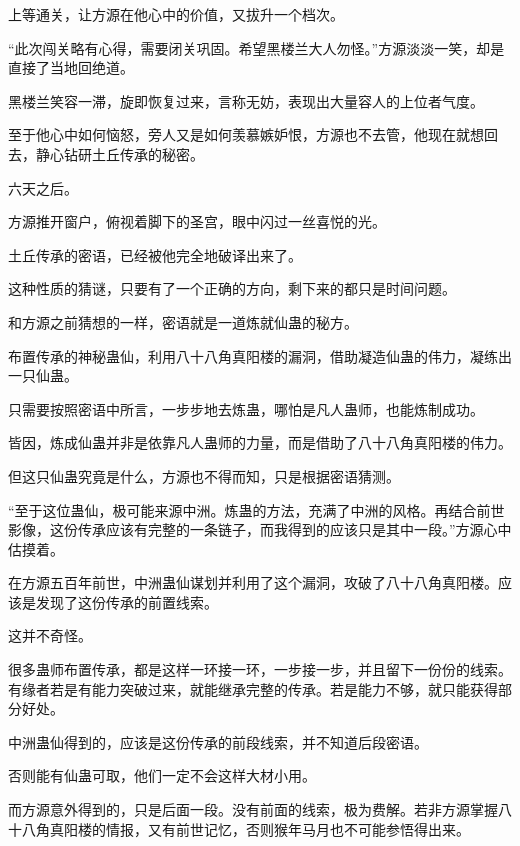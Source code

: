 \begin{this_body}
上等通关，让方源在他心中的价值，又拔升一个档次。

“此次闯关略有心得，需要闭关巩固。希望黑楼兰大人勿怪。”方源淡淡一笑，却是直接了当地回绝道。

黑楼兰笑容一滞，旋即恢复过来，言称无妨，表现出大量容人的上位者气度。

至于他心中如何恼怒，旁人又是如何羡慕嫉妒恨，方源也不去管，他现在就想回去，静心钻研土丘传承的秘密。

六天之后。

方源推开窗户，俯视着脚下的圣宫，眼中闪过一丝喜悦的光。

土丘传承的密语，已经被他完全地破译出来了。

这种性质的猜谜，只要有了一个正确的方向，剩下来的都只是时间问题。

和方源之前猜想的一样，密语就是一道炼就仙蛊的秘方。

布置传承的神秘蛊仙，利用八十八角真阳楼的漏洞，借助凝造仙蛊的伟力，凝练出一只仙蛊。

只需要按照密语中所言，一步步地去炼蛊，哪怕是凡人蛊师，也能炼制成功。

皆因，炼成仙蛊并非是依靠凡人蛊师的力量，而是借助了八十八角真阳楼的伟力。

但这只仙蛊究竟是什么，方源也不得而知，只是根据密语猜测。

“至于这位蛊仙，极可能来源中洲。炼蛊的方法，充满了中洲的风格。再结合前世影像，这份传承应该有完整的一条链子，而我得到的应该只是其中一段。”方源心中估摸着。

在方源五百年前世，中洲蛊仙谋划并利用了这个漏洞，攻破了八十八角真阳楼。应该是发现了这份传承的前置线索。

这并不奇怪。

很多蛊师布置传承，都是这样一环接一环，一步接一步，并且留下一份份的线索。有缘者若是有能力突破过来，就能继承完整的传承。若是能力不够，就只能获得部分好处。

中洲蛊仙得到的，应该是这份传承的前段线索，并不知道后段密语。

否则能有仙蛊可取，他们一定不会这样大材小用。

而方源意外得到的，只是后面一段。没有前面的线索，极为费解。若非方源掌握八十八角真阳楼的情报，又有前世记忆，否则猴年马月也不可能参悟得出来。

\end{this_body}

